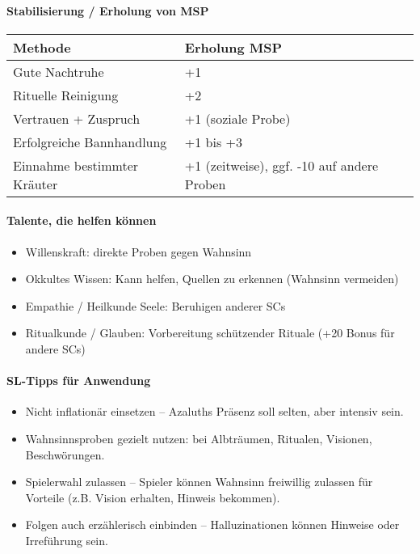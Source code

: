\paragraph{Stabilisierung / Erholung von MSP}
\begin{center}
\begin{tabular}{lll}
\toprule
\textbf{Methode} & \textbf{Erholung MSP}\\
\midrule 
Gute Nachtruhe & +1\\
\midrule 
Rituelle Reinigung & +2\\
\midrule 
Vertrauen + Zuspruch & +1 (soziale Probe)\\
\midrule 
Erfolgreiche Bannhandlung & +1 bis +3\\
\midrule 
Einnahme bestimmter Kräuter & +1 (zeitweise), ggf. -10 auf andere Proben\\
\bottomrule
\end{tabular} 
\end{center}

\paragraph{Talente, die helfen können}
\begin{itemize}
\item Willenskraft: direkte Proben gegen Wahnsinn
\item Okkultes Wissen: Kann helfen, Quellen zu erkennen (Wahnsinn vermeiden)
\item Empathie / Heilkunde Seele: Beruhigen anderer SCs
\item Ritualkunde / Glauben: Vorbereitung schützender Rituale (+20 Bonus für andere SCs)
\end{itemize}

\paragraph{SL-Tipps für Anwendung}

\begin{itemize}
\item Nicht inflationär einsetzen – Azaluths Präsenz soll selten, aber intensiv sein.
\item Wahnsinnsproben gezielt nutzen: bei Albträumen, Ritualen, Visionen, Beschwörungen.
\item Spielerwahl zulassen – Spieler können Wahnsinn freiwillig zulassen für Vorteile (z.B. Vision erhalten, Hinweis bekommen).
\item Folgen auch erzählerisch einbinden – Halluzinationen können Hinweise oder Irreführung sein.
\end{itemize}